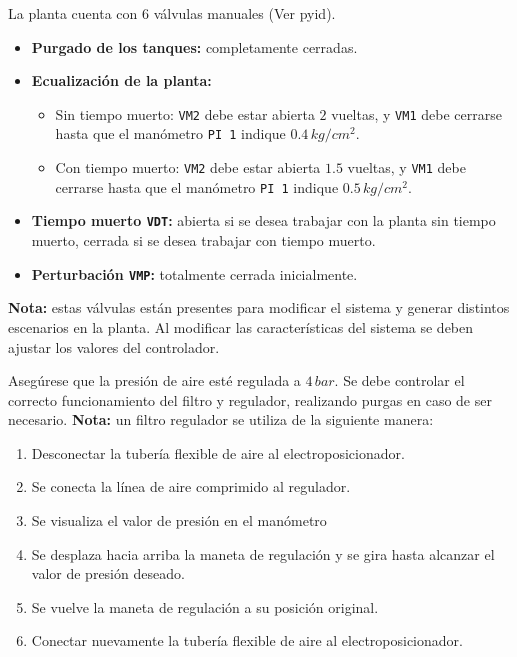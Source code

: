 \begin{tcolorbox}[title=Válvulas manuales, breakable]

La planta cuenta con 6 válvulas manuales (Ver \gls{pyid}).

 \begin{itemize}
  \item \textbf{Purgado de los tanques:} completamente cerradas.
  \item \textbf{Ecualización de la planta:}
  \begin{itemize}
   \item Sin tiempo muerto: \verb|VM2| debe estar abierta $2$ vueltas, y
   \verb|VM1| debe cerrarse hasta que el manómetro \verb|PI 1| indique
   $0.4\,kg/cm^2$.
   \item Con tiempo muerto: \verb|VM2| debe estar abierta $1.5$ vueltas, y
   \verb|VM1| debe cerrarse hasta que el manómetro \verb|PI 1| indique
   $0.5\,kg/cm^2$.
  \end{itemize}
  \item \textbf{Tiempo muerto \texttt{VDT}:} abierta si se desea trabajar con
la planta sin tiempo muerto, cerrada si se desea trabajar con tiempo muerto.
  \item \textbf{Perturbación \texttt{VMP}:} totalmente cerrada inicialmente.
 \end{itemize}
 \tcblower
 \textbf{Nota:} estas válvulas están presentes para modificar el sistema y
generar distintos
escenarios en la planta. Al modificar las características del sistema se deben
ajustar los valores del controlador.
\end {tcolorbox}

\begin{tcolorbox}[title=Presión de aire en la válvula]
  Asegúrese que la presión de aire esté regulada a $4\,bar$. Se debe controlar
  el correcto funcionamiento del filtro y regulador, realizando purgas en caso
de ser necesario.
 \tcblower
  \textbf{Nota:} un filtro regulador se utiliza de la siguiente manera:
 \begin{enumerate}
    \item Desconectar la tubería flexible de aire al electroposicionador.
    \item Se conecta la línea de aire comprimido al regulador.
    \item Se visualiza el valor de presión en el manómetro
    \item Se desplaza hacia arriba la maneta de regulación y se gira hasta
      alcanzar el valor de presión deseado.
    \item Se vuelve la maneta de regulación a su posición original.
    \item Conectar nuevamente la tubería flexible de aire al
electroposicionador.
 \end{enumerate}
\end {tcolorbox}

